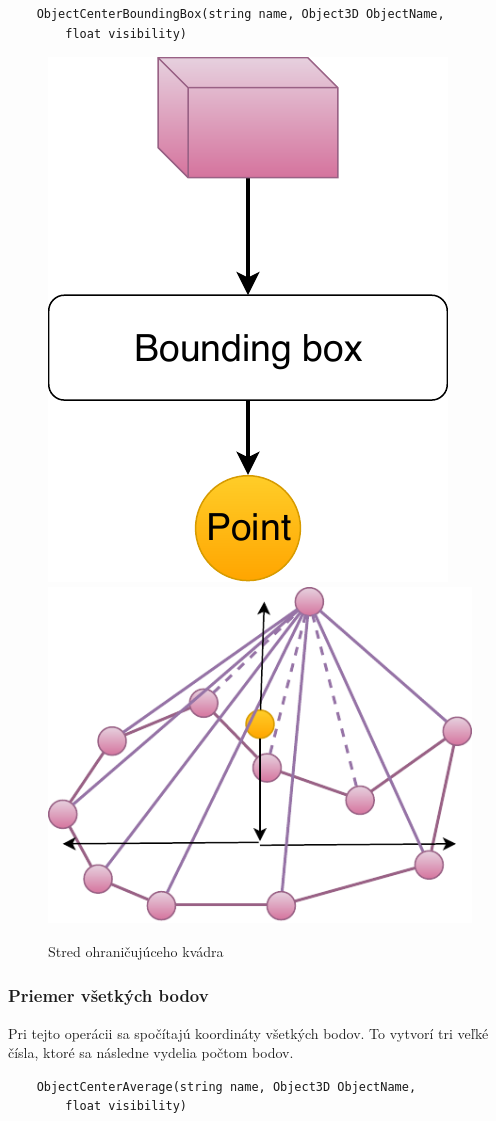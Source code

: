 \begin{lstlisting}
	ObjectCenterBoundingBox(string name, Object3D ObjectName, 
		float visibility)
\end{lstlisting}
		
\begin{figure}[H]
	\centering
	\includegraphics[height=0.3\textwidth]{obrazky-figures/Diagram/Point/DP Navrh operacii-0D - PointMiddle of 3D object.pdf}
	\includegraphics[height=0.3\textwidth]{obrazky-figures/Diagram/Draw/1Points/DP Navrh operacii-0D - PointMiddle of 3D object.pdf}
	\caption{Stred ohraničujúceho kvádra}
	\label{fig:1}
\end{figure}

\subsubsection{Priemer všetkých bodov} 
Pri tejto operácii sa spočítajú koordináty všetkých bodov. To vytvorí tri veľké čísla, ktoré sa následne vydelia počtom bodov.

\begin{lstlisting}
	ObjectCenterAverage(string name, Object3D ObjectName,
		float visibility)
\end{lstlisting}

